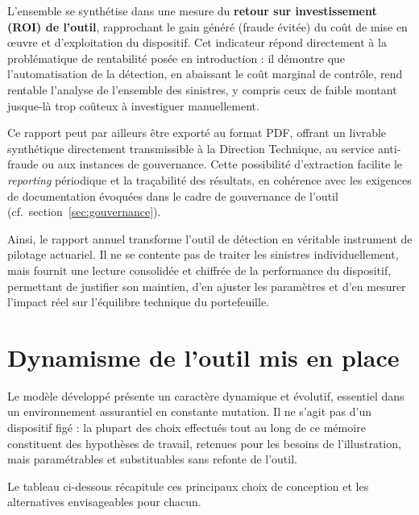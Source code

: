 L'ensemble se synthétise dans une mesure du \textbf{retour sur investissement (ROI) de l'outil}, rapprochant le gain généré (fraude évitée) du coût de mise en œuvre et d'exploitation du dispositif. Cet indicateur répond directement à la problématique de rentabilité posée en introduction : il démontre que l'automatisation de la détection, en abaissant le coût marginal de contrôle, rend rentable l'analyse de l'ensemble des sinistres, y compris ceux de faible montant jusque-là trop coûteux à investiguer manuellement.

Ce rapport peut par ailleurs être exporté au format PDF, offrant un livrable synthétique directement transmissible à la Direction Technique, au service anti-fraude ou aux instances de gouvernance. Cette possibilité d'extraction facilite le \textit{reporting} périodique et la traçabilité des résultats, en cohérence avec les exigences de documentation évoquées dans le cadre de gouvernance de l'outil (cf.~section~\ref{sec:gouvernance}).

Ainsi, le rapport annuel transforme l'outil de détection en véritable instrument de pilotage actuariel. Il ne se contente pas de traiter les sinistres individuellement, mais fournit une lecture consolidée et chiffrée de la performance du dispositif, permettant de justifier son maintien, d'en ajuster les paramètres et d'en mesurer l'impact réel sur l'équilibre technique du portefeuille.

\section{Dynamisme de l'outil mis en place}

Le modèle développé présente un caractère dynamique et évolutif, essentiel dans un environnement assurantiel en constante mutation. Il ne s'agit pas d'un dispositif figé : la plupart des choix effectués tout au long de ce mémoire constituent des hypothèses de travail, retenues pour les besoins de l'illustration, mais paramétrables et substituables sans refonte de l'outil.

Le tableau ci-dessous récapitule ces principaux choix de conception et les alternatives envisageables pour chacun.

